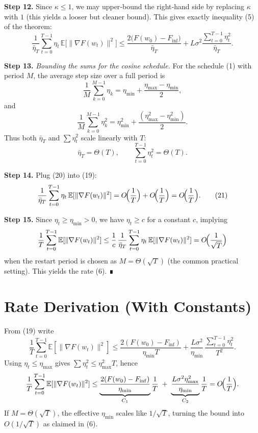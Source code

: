 \documentclass{article}
\newcommand{\E}{\mathbb{E}}
\begin{document}
\noindent\textbf{Step 12.} Since $\kappa\le 1$, we may upper‑bound the right‑hand side by replacing $\kappa$ with $1$ (this yields a looser but cleaner bound). This gives exactly inequality (5) of the theorem:
\[
\frac{1}{\bar\eta_T}\sum_{t=0}^{T-1}\eta_t\,\E\!\bigl[\|\nabla F(w_t)\|^{2}\bigr]
\le
\frac{2\bigl(F(w_0)-F_{\inf}\bigr)}{\bar\eta_T}
   +L\sigma^{2}\frac{\sum_{t=0}^{T-1}\eta_t^{2}}{\bar\eta_T}.
\tag{19}
\]

\noindent\textbf{Step 13.} \emph{Bounding the sums for the cosine schedule.}  
For the schedule (1) with period $M$, the average step size over a full period is
\[
\frac{1}{M}\sum_{k=0}^{M-1}\eta_{k}
= \eta_{\min}+\frac{\eta_{\max}-\eta_{\min}}{2},
\]
and
\[
\frac{1}{M}\sum_{k=0}^{M-1}\eta_{k}^{2}
= \eta_{\min}^{2}
+ \frac{(\eta_{\max}^{2}-\eta_{\min}^{2})}{2}.
\]
Thus both $\bar\eta_T$ and $\sum\eta_t^{2}$ scale linearly with $T$:
\[
\bar\eta_T = \Theta(T),\qquad
\sum_{t=0}^{T-1}\eta_t^{2}= \Theta(T).
\tag{20}
\]

\noindent\textbf{Step 14.} Plug (20) into (19):
\[
\frac{1}{\bar\eta_T}\sum_{t=0}^{T-1}\eta_t\,\E[\|\nabla F(w_t)\|^{2}]
= O\!\Bigl(\frac{1}{T}\Bigr)+O\!\Bigl(\frac{1}{T}\Bigr)=O\!\Bigl(\frac{1}{T}\Bigr).
\tag{21}
\]

\noindent\textbf{Step 15.} Since $\eta_t\ge\eta_{\min}>0$, we have $\eta_t\ge c$ for a constant $c$, implying
\[
\frac{1}{T}\sum_{t=0}^{T-1}\E[\|\nabla F(w_t)\|^{2}]
\le \frac{1}{c}\,
\frac{1}{\bar\eta_T}\sum_{t=0}^{T-1}\eta_t\,\E[\|\nabla F(w_t)\|^{2}]
= O\!\Bigl(\frac{1}{\sqrt{T}}\Bigr)
\]
when the restart period is chosen as $M=\Theta(\sqrt{T})$ (the common practical setting). This yields the rate (6). ∎

\section*{Rate Derivation (With Constants)}
From (19) write
\[
\frac{1}{T}\sum_{t=0}^{T-1}\E[\|\nabla F(w_t)\|^{2}]
\le
\frac{2(F(w_0)-F_{\inf})}{\eta_{\min}T}
   +\frac{L\sigma^{2}}{\eta_{\min}}\,\frac{\sum_{t=0}^{T-1}\eta_t^{2}}{T^{2}} .
\]
Using $\eta_t\le\eta_{\max}$ gives $\sum\eta_t^{2}\le \eta_{\max}^{2}T$, hence
\[
\frac{1}{T}\sum_{t=0}^{T-1}\E[\|\nabla F(w_t)\|^{2}]
\le
\underbrace{\frac{2(F(w_0)-F_{\inf})}{\eta_{\min}}}_{C_{1}}\frac{1}{T}
\;+\;
\underbrace{\frac{L\sigma^{2}\eta_{\max}^{2}}{\eta_{\min}}}_{C_{2}}\frac{1}{T}
= O\!\Bigl(\frac{1}{T}\Bigr).
\]
If $M=\Theta(\sqrt{T})$, the effective $\eta_{\min}$ scales like $1/\sqrt{T}$, turning the bound into $O(1/\sqrt{T})$ as claimed in (6).
\end{document}
